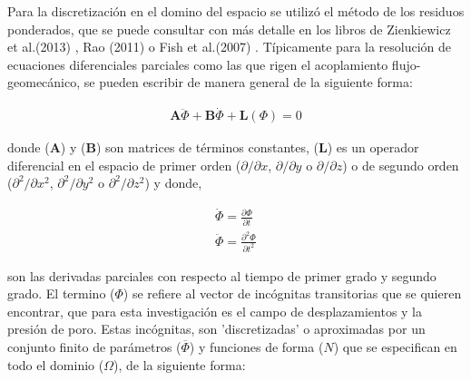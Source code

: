 Para la discretización en el domino del espacio se utilizó el método de los residuos ponderados, que se puede consultar con más detalle en los libros de Zienkiewicz et al.(2013) \cite{Zienkiewicz2013TheFundamentals}, Rao (2011) \cite{Rao2011TheEngineering} o Fish et al.(2007) \cite{Fish2007AElements}. Típicamente para la resolución de ecuaciones diferenciales parciales como las que rigen el acoplamiento flujo-geomecánico, se pueden escribir de manera general de la siguiente forma:

\begin{ceqn} %
\begin{gather}\label{eq:equ354}
\mathbf{A}\ddot{\Phi} + \mathbf{B}\dot{\Phi} + \mathbf{L}(\Phi) = 0
\end{gather}   
\end{ceqn}

donde ($\mathbf{A}$) y ($\mathbf{B}$) son matrices de términos constantes, ($\mathbf{L}$) es un operador diferencial en el espacio de primer orden ($\partial/\partial x$, $\partial/\partial y$ o $\partial/\partial z$) o de segundo orden ($\partial^2/\partial x^2$, $\partial^2/\partial y^2$ o $\partial^2/\partial z^2$) y donde,

\begin{ceqn} 
\begin{subequations} \label{eq:equ355} 
\begin{gather}
\dot{\Phi}  = \frac{\partial \Phi}{\partial t} \label{eq:equ355a}\\[12pt]
\ddot{\Phi}  = \frac{\partial^2 \Phi}{\partial t^2}  \label{eq:equ355b}
\end{gather}  
\end{subequations} 
\end{ceqn}

son las derivadas parciales con respecto al tiempo de primer grado y segundo grado. El termino ($\Phi$) se refiere al vector de incógnitas transitorias que se quieren encontrar, que para esta investigación es el campo de desplazamientos y la presión de poro. Estas incógnitas, son 'discretizadas' o aproximadas por un conjunto finito de parámetros ($\overline{\Phi}$) y funciones de forma ($N$) que se especifican en todo el dominio ($\Omega$), de la siguiente forma:

